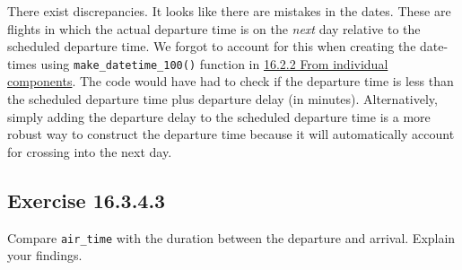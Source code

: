 \documentclass[]{book}
\newenvironment{Shaded}{\begin{snugshade}}{\end{snugshade}}
\newcommand{\CommentTok}[1]{\textcolor[rgb]{0.56,0.35,0.01}{\textit{#1}}}
\newcommand{\DataTypeTok}[1]{\textcolor[rgb]{0.13,0.29,0.53}{#1}}
\newcommand{\KeywordTok}[1]{\textcolor[rgb]{0.13,0.29,0.53}{\textbf{#1}}}
\newcommand{\NormalTok}[1]{#1}
\newcommand{\OperatorTok}[1]{\textcolor[rgb]{0.81,0.36,0.00}{\textbf{#1}}}
\newcommand{\StringTok}[1]{\textcolor[rgb]{0.31,0.60,0.02}{#1}}
\theoremstyle{plain}
\theoremstyle{remark}
\begin{document}
There exist discrepancies. It looks like there are mistakes in the dates. These
are flights in which the actual departure time is on the \emph{next} day relative to
the scheduled departure time. We forgot to account for this when creating the
date-times using \texttt{make\_datetime\_100()} function in \href{https://r4ds.had.co.nz/dates-and-times.html\#from-individual-components}{16.2.2 From individual components}. The code would have had to check if the departure time is less than
the scheduled departure time plus departure delay (in minutes). Alternatively, simply adding the departure delay to the scheduled departure time is a more robust way to construct the departure time because it will automatically account for crossing into the next day.

\hypertarget{exercise-16.3.4.3}{%
\subsection*{\texorpdfstring{Exercise {16.3.4.3}}{Exercise 16.3.4.3}}\label{exercise-16.3.4.3}}

Compare \texttt{air\_time} with the duration between the departure and arrival. Explain your findings.

\begin{Shaded}
\end{Shaded}
\end{document}
